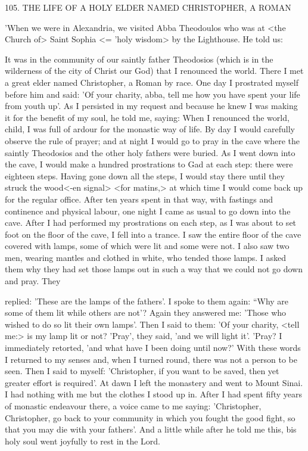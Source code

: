 105. THE LIFE OF A HOLY ELDER NAMED
CHRISTOPHER, A ROMAN

'When we were in Alexandria, we visited Abba Theodoulos who was
at <the Church of> Saint Sophia <= 'holy wisdom\textquotesingle > by the
Lighthouse. He told us:

It was in the community of our saintly father Theodosios (which is
in the wilderness of the city of Christ our God) that I renounced the
world. There I met a great elder named Christopher, a Roman by
race. One day I prostrated myself before him and said: 'Of your
charity, abba, tell me how you have spent your life from youth up'.
As I persisted in my request and because he knew I was making it
for the benefit of my soul, he told me, saying: When I renounced
the world, child, I was full of ardour for the monastic way of life.
By day I would carefully observe the rule of prayer; and at night I
would go to pray in the cave where the saintly Theodosios and the
other holy fathers were buried. As I went down into the cave, I
would make a hundred prostrations to Gad at each step: there were
eighteen steps. Having gone down all the steps, I would stay there
until they struck the wood<-en signal> <for matins,> at which time
I would come back up for the regular office. After ten years spent
in that way, with fastings and continence and physical labour, one
night I came as usual to go down into the cave. After I had
performed my prostrations on each step, as I was about to set foot
on the floor of the cave, I fell into a trance. I saw the entire floor
of the cave covered with lamps, some of which were lit and some
were not. I also saw two men, wearing mantles and clothed in white,
who tended those lamps. I asked them why they had set those lamps
out in such a way that we could not go down and pray. They

replied: 'These are the lamps of the fathers'. I spoke to them again:
“Why are some of them lit while others are not'? Again they
answered me: 'Those who wished to do so lit their own lamps'.
Then I said to them: 'Of your charity, <tell me:> is my lamp lit or
not? 'Pray', they said, 'and we will light it'. 'Pray? I immediately
retorted, 'and what have I been doing until now?' With these words
I returned to my senses and, when I turned round, there was not a
person to be seen. Then I said to myself: 'Christopher, if you want
to be saved, then yet greater effort is required'. At dawn I left the
monastery and went to Mount Sinai. I had nothing with me but the
clothes I stood up in. After I had spent fifty years of monastic
endeavour there, a voice came to me saying: 'Christopher,
Christopher, go back to your community in which you fought the
good fight, so that you may die with your fathers'. And a little
while after he told me this, bis holy soul went joyfully to rest in the
Lord.

